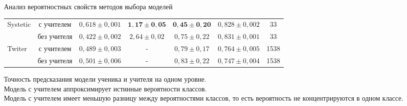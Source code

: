 \documentclass[10pt,pdf,hyperref={unicode}]{beamer}
\begin{document}
\begin{frame}{Анализ вероятностных свойств методов выбора моделей}
\begin{table}[]
\begin{center}
{\begin{tabular}{|l|c|c|c|c|c|c|}
\multirow{2}{*}{Systetic}     & с учителем  & $0{,}618\pm0{,}001$                                                & $\mathbf{1{,}17}\pm\mathbf{0{,}05}$                                                                             & $\mathbf{0{,}45}\pm\mathbf{0{,}20}$                                               & $0{,}828\pm0{,}002$ & 33                                                         \\ \cline{2-7} 
                              & без учителя & $0{,}422\pm0{,}002$                                                & $2{,}64\pm0{,}02$                                                                             & $0{,}75\pm0{,}22$                                               & $0{,}831\pm0{,}001$ & 33                                                         \\ \hline \hline
\multirow{2}{*}{Twiter}       & с учителем  & $0{,}489\pm0{,}003$                                               & -                                                                                             & $0{,}79\pm0{,}17$                                               & $0{,}764\pm0{,}005$ & 1538                                                       \\ \cline{2-7} 
                              & без учителя &  $0{,}501\pm0{,}006$                                                & -                                                                                             & $0{,}83\pm0{,}22$                                               & $0{,}747\pm0{,}004$ & 1538                                                       \\ \hline 
\end{tabular}
}
\end{center}
\end{table}

Точность предсказания модели ученика и учителя на одном уровне.\\
{\color{blue}Модель с учителем аппроксимирует истинные вероятности классов.}\\
{\color{red}Модель с учителем имеет меньшую разницу между вероятностями классов, то есть вероятность не концентрируются в одном классе.}
\end{frame}
\end{document}
